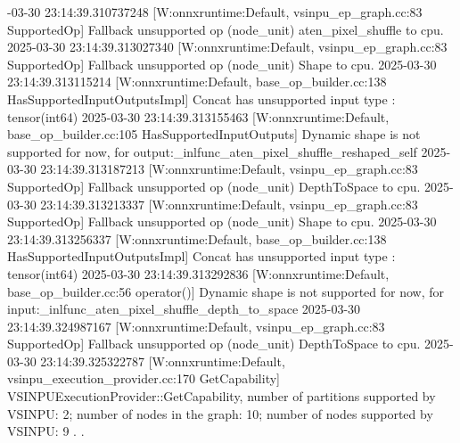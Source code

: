 -03-30 23:14:39.310737248 [W:onnxruntime:Default, vsinpu_ep_graph.cc:83 SupportedOp] Fallback unsupported op (node_unit) aten_pixel_shuffle  to cpu.
2025-03-30 23:14:39.313027340 [W:onnxruntime:Default, vsinpu_ep_graph.cc:83 SupportedOp] Fallback unsupported op (node_unit) Shape  to cpu.
2025-03-30 23:14:39.313115214 [W:onnxruntime:Default, base_op_builder.cc:138 HasSupportedInputOutputsImpl] Concat has unsupported input type : tensor(int64)
2025-03-30 23:14:39.313155463 [W:onnxruntime:Default, base_op_builder.cc:105 HasSupportedInputOutputs] Dynamic shape is not supported for now, for output:_inlfunc_aten_pixel_shuffle_reshaped_self
2025-03-30 23:14:39.313187213 [W:onnxruntime:Default, vsinpu_ep_graph.cc:83 SupportedOp] Fallback unsupported op (node_unit) DepthToSpace  to cpu.
2025-03-30 23:14:39.313213337 [W:onnxruntime:Default, vsinpu_ep_graph.cc:83 SupportedOp] Fallback unsupported op (node_unit) Shape  to cpu.
2025-03-30 23:14:39.313256337 [W:onnxruntime:Default, base_op_builder.cc:138 HasSupportedInputOutputsImpl] Concat has unsupported input type : tensor(int64)
2025-03-30 23:14:39.313292836 [W:onnxruntime:Default, base_op_builder.cc:56 operator()] Dynamic shape is not supported for now, for input:_inlfunc_aten_pixel_shuffle_depth_to_space
2025-03-30 23:14:39.324987167 [W:onnxruntime:Default, vsinpu_ep_graph.cc:83 SupportedOp] Fallback unsupported op (node_unit) DepthToSpace  to cpu.
2025-03-30 23:14:39.325322787 [W:onnxruntime:Default, vsinpu_execution_provider.cc:170 GetCapability] VSINPUExecutionProvider::GetCapability, number of partitions supported by VSINPU: 2; number of nodes in the graph: 10; number of nodes supported by VSINPU: 9
\endtt
.
.

\bye
